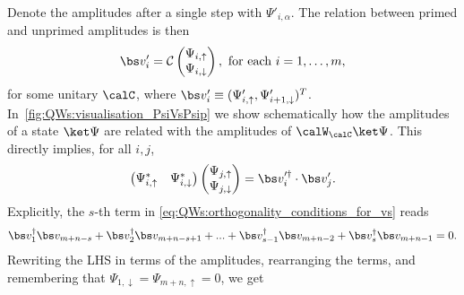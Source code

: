 Denote the amplitudes after a single step with $\Psi'_{i,\alpha}$.
The relation between primed and unprimed amplitudes is then
\begin{equation}
	\bs v_i^\prime
	= \mathcal C
	\begin{pmatrix}
		\Psi_{i,\uparrow} \\ \Psi_{i, \downarrow}
	\end{pmatrix},
	\text{ for each }
	i = 1, \dots, m,
\end{equation}
for some unitary $\calC$,
where $\bs v'_i \equiv (\Psi_{i,\uparrow}',\Psi_{i+1,\downarrow}')^T$.
In~\cref{fig:QWs:visualisation_PsiVsPsip} we show schematically how the amplitudes of a state $\ket\Psi$ are related with the amplitudes of $\calW_\calC\ket\Psi$.
This directly implies, for all $i, j$,
\begin{equation}
	\begin{pmatrix}
		\Psi^*_{i, \uparrow} & \Psi^*_{i, \downarrow}
	\end{pmatrix}
	\begin{pmatrix}
		\Psi_{j, \uparrow} \\ \Psi_{j, \downarrow}
	\end{pmatrix}
	=
	\bs v^{\prime\dagger}_{i} \cdot \bs v^\prime_j.
    \label{eq:QWs:transition_us_to_vprimes}
\end{equation}
Explicitly, the $s$-th term in \cref{eq:QWs:orthogonality_conditions_for_vs} reads
\begin{equation}
	\bs v_1^\dagger \bs v_{m+n-s}
	+ \bs v_2^\dagger \bs v_{m+n-s+1}
	+ ...
	+ \bs v_{s-1}^\dagger \bs v_{m+n-2}
    + \bs v_s^\dagger \bs v_{m+n-1} = 0.
\end{equation}
Rewriting the LHS in terms of the amplitudes, rearranging the terms, and remembering that $\Psi_{1, \downarrow} = \Psi_{m+n, \uparrow} = 0$, we get
